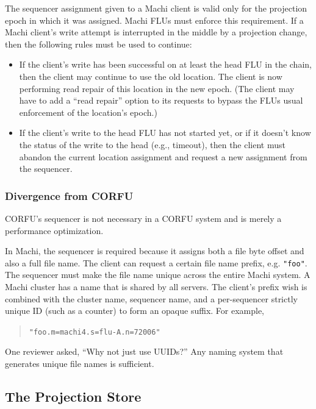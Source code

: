 \documentclass[preprint,10pt]{sigplanconf}
\begin{document}
The sequencer assignment given to a Machi client is valid only for the
projection epoch in which it was assigned.  Machi FLUs must enforce
this requirement.  If a Machi client's write attempt is interrupted in
the middle by a projection change, then the following rules must be
used to continue:

\begin{itemize}
\item If the client's write has been successful on at least the head
  FLU in the chain, then the client may continue to use the old
  location.  The client is now performing read repair of this location in
  the new epoch.  (The client may have to add a ``read repair'' option
  to its requests to bypass the FLUs usual enforcement of the
  location's epoch.)
\item If the client's write to the head FLU has not started yet, or if
  it doesn't know the status of the write to the head (e.g., timeout),
  then the client must abandon the current location assignment and
  request a new assignment from the sequencer.
\end{itemize}

\subsubsection{Divergence from CORFU}
\label{sub:sequencer-divergence}

CORFU's sequencer is not
necessary in a CORFU system and is merely a performance optimization.  

In Machi, the sequencer is required because it assigns both a file
byte offset and also a full file name.  The client can request a
certain file name prefix, e.g. {\tt "foo"}.  The sequencer must make
the file name unique across the entire Machi system.  A Machi cluster
has a name that is shared by all servers.  The client's prefix
wish is combined with the cluster name, sequencer name, and a
per-sequencer strictly unique ID (such as a counter) to form an opaque
suffix.
For example,
\begin{quote}
{\tt "foo.m=machi4.s=flu-A.n=72006"}
\end{quote}

One reviewer asked, ``Why not just use UUIDs?''  Any naming system
that generates unique file names is sufficient.

\subsection{The Projection Store}
\label{sub:proj-store}
\end{document}
